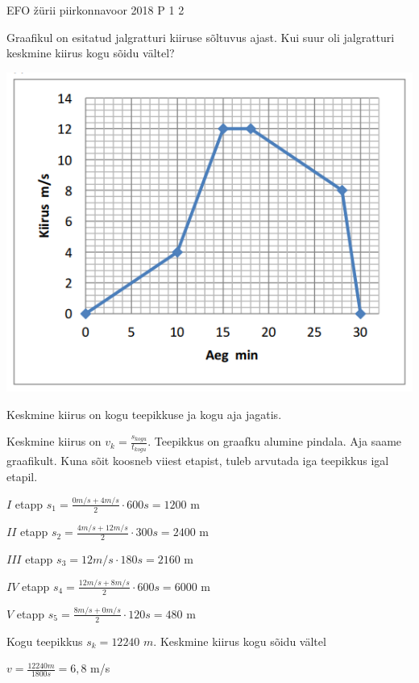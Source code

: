 {EFO žürii} %
{piirkonnavoor} %
{2018} %
{P 1} %
{2} %
{

\ifStatement
Graafikul on esitatud jalgratturi kiiruse sõltuvus ajast. Kui suur oli jalgratturi keskmine kiirus kogu sõidu vältel?
\begin{center}
	\includegraphics[width=0.5\linewidth]{2018-v2p-01-yl.PNG}
\end{center}
\fi

\ifHint
Keskmine kiirus on kogu teepikkuse ja kogu aja jagatis.
\fi

\ifSolution
Keskmine kiirus on $v_k = \frac{s_{kogu}}{t_{kogu}}$.
Teepikkus on graafku alumine pindala.
Aja saame graafikult. Kuna sõit koosneb viiest etapist, tuleb arvutada iga teepikkus igal etapil.
\begin{center}
$I$ etapp $s_1 = \frac{0 m/s + 4 m/s}{2} \cdot 600s = 1200$ m
\end{center}
\begin{center}
$II$ etapp $s_2 = \frac{4 m/s + 12 m/s}{2} \cdot 300s = 2400$ m
\end{center}
\begin{center}
$III$ etapp $s_3 = 12 m/s \cdot 180s = 2160$ m
\end{center}
\begin{center}
$IV$ etapp $s_4 = \frac{12 m/s + 8 m/s}{2} \cdot 600s = 6000$ m
\end{center}
\begin{center}
$V$ etapp $s_5 = \frac{8 m/s + 0 m/s}{2} \cdot 120s = 480$ m
\end{center}
Kogu teepikkus $s_k = 12 240$ $m$. Keskmine kiirus kogu sõidu vältel
\begin{center}
$v = \frac{12 240 m}{1800s} = 6,8$ m/s
\end{center}
\fi
}
